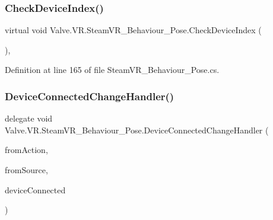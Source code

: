 \mbox{\label{class_valve_1_1_v_r_1_1_steam_v_r___behaviour___pose_aec903264cd15509cc38de0fc70629472}} 
\subsubsection{\texorpdfstring{CheckDeviceIndex()}{CheckDeviceIndex()}}
{\footnotesize\ttfamily virtual void Valve.\+V\+R.\+Steam\+V\+R\+\_\+\+Behaviour\+\_\+\+Pose.\+Check\+Device\+Index (\begin{DoxyParamCaption}{ }\end{DoxyParamCaption})\hspace{0.3cm}{\ttfamily [protected]}, {\ttfamily [virtual]}}



Definition at line 165 of file Steam\+V\+R\+\_\+\+Behaviour\+\_\+\+Pose.\+cs.

\mbox{\label{class_valve_1_1_v_r_1_1_steam_v_r___behaviour___pose_abb026a5887e19143d6b95452453dc8de}} 
\subsubsection{\texorpdfstring{DeviceConnectedChangeHandler()}{DeviceConnectedChangeHandler()}}
{\footnotesize\ttfamily delegate void Valve.\+V\+R.\+Steam\+V\+R\+\_\+\+Behaviour\+\_\+\+Pose.\+Device\+Connected\+Change\+Handler (\begin{DoxyParamCaption}\item[{\mbox{\hyperlink{class_valve_1_1_v_r_1_1_steam_v_r___behaviour___pose}{Steam\+V\+R\+\_\+\+Behaviour\+\_\+\+Pose}}}]{from\+Action,  }\item[{\mbox{\hyperlink{namespace_valve_1_1_v_r_a82e5bf501cc3aa155444ee3f0662853f}{Steam\+V\+R\+\_\+\+Input\+\_\+\+Sources}}}]{from\+Source,  }\item[{bool}]{device\+Connected }\end{DoxyParamCaption})}

